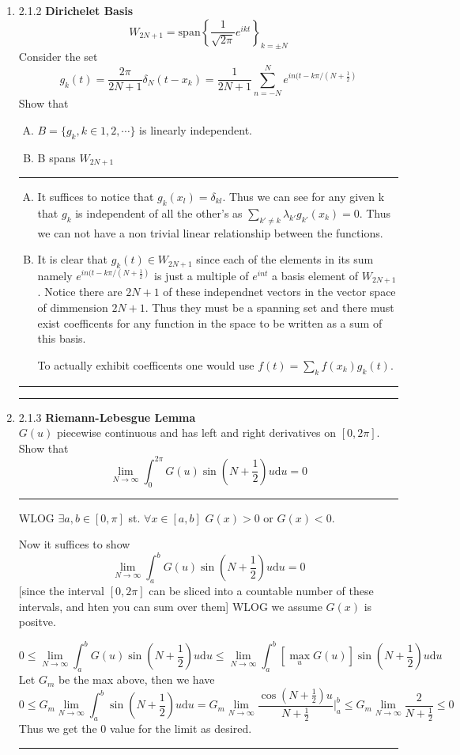 \documentclass[12pt]{article}
\newcommand{\rw}{\rightarrow}
\newcommand{\di}{\mathrm{d}}
\theoremstyle{definition}
\begin{document}
\begin{enumerate}
\hrule
\item 2.1.2
	{\bf Dirichelet Basis}
	\[
		W_{2N+1} = \text{span} \left\{ \frac 1 {\sqrt{2\pi} } e^{ikt} \right\} _{k=\pm N}
	\]
	Consider the set 
	\[
g_k(t) = \frac {2 \pi} { 2 N+1} \delta_N (t-x_k) = 
\frac 1 {2N+1} \sum_{n=-N}^N e^{in(t-k\pi / (N+\frac 1 2) } 
	\]
	Show that
	\begin{enumerate}[A)]
		\item $B = \{ g_k , k \in 1,2, \cdots \}$ is linearly independent.
		\item B spans $W_{2N+1}$
	\end{enumerate}
\hrule
	\begin{enumerate}[A)]
	\item
		It suffices to notice that $g_k(x_l) = \delta_{kl}$. Thus we can see for any given k that $g_k$ is independent of all the other's as $\sum_{k' \neq k} \lambda_{k'} g_{k'} (x_k) = 0$. Thus we can not have a non trivial linear relationship between the functions. 
	\item
		It is clear that $g_k(t) \in W_{2N+1}$ since each of the elements in its sum namely $e^{in(t-k\pi/(N+\frac 1 2)}$ is just a multiple of $e^{int}$ a basis element of $W_{2N+1}$.
		Notice there are $2N+1$ of these independnet vectors in the vector space of dimmension $2N+1$. 
			Thus they must be a spanning set and there must exist coefficents for any function in the space to be written as a sum of this basis.

		To actually exhibit coefficents one would use $f(t) = \sum_k f(x_k) g_k(t)$. 
		
	\end{enumerate}
\hrule


\hrule
\item 2.1.3
	{\bf Riemann-Lebesgue Lemma}\\
$G(u)$ piecewise continuous and has left and right derivatives on $[0,2\pi]$. Show that 
\[
\lim_{N \rw \infty} \int_0^{2\pi} G(u) \sin ( N +\frac 1 2)u \di u=0
\]
\hrule
WLOG $\exists a,b \in [0,\pi]$ st. $\forall x \in [a,b]$ $G(x) >0$ or $G(x) <0$.

Now it suffices to show 
\[
\lim_{N \rw \infty} \int_a^{b} G(u) \sin ( N +\frac 1 2)u \di u =0
\]
[since the interval $[0,2\pi]$ can be sliced into a countable number of these intervals, and hten you can sum over them]
WLOG we assume $G(x)$ is positve.

\[
0 \leq 
\lim_{N \rw \infty} \int_a^{b} G(u) \sin ( N +\frac 1 2)u \di u 
\leq
\lim_{N \rw \infty} \int_a^{b} [\max_u G(u)] \sin ( N +\frac 1 2)u \di u 
\]
Let $G_m$ be the max above, then we have
\[
0 \leq G_m\lim_{N \rw \infty} \int_a^{b} \sin ( N +\frac 1 2)u \di u 
= G_m\lim_{N \rw \infty}  
\frac{\cos ( N +\frac 1 2)u }
{N + \frac 1 2}|_a^{b}
\leq
 G_m\lim_{N \rw \infty}  
 \frac 2
{N + \frac 1 2}
\leq 0
\]
Thus we get the 0 value for the limit as desired.
\hrule



\end{enumerate}
\end{document}
